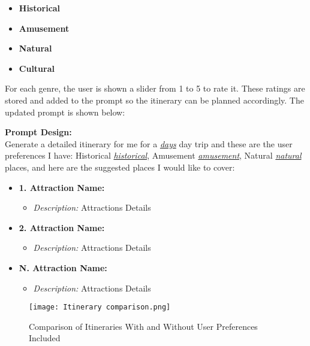 \documentclass[sigconf,authordraft]{acmart}
\begin{document}
\begin{itemize}
  \item \textbf{Historical}
  \item \textbf{Amusement}
  \item \textbf{Natural}
  \item \textbf{Cultural}
\end{itemize}

For each genre, the user is shown a slider from 1 to 5 to rate it. These ratings are stored and added to the prompt so the itinerary can be planned accordingly. The updated prompt is shown below:

\begin{tcolorbox}[linewidth=1pt, innerleftmargin=15pt, innerrightmargin=15pt, innertopmargin=15pt, innerbottommargin=15pt]
  \textbf{Prompt Design:} \\

  Generate a detailed itinerary for me for a \underline{\textit{days}} day trip and these are the user preferences I have: 
  Historical \underline{\textit{historical}}, Amusement \underline{\textit{amusement}}, Natural \underline{\textit{natural}} places, and here are the suggested places I would like to cover:

  \begin{itemize}
    \item \textbf{1. Attraction Name:}
    \begin{itemize}
        \item \textit{Description:} Attractions Details
    \end{itemize}
    \item \textbf{2. Attraction Name:}
    \begin{itemize}
        \item \textit{Description:} Attractions Details
    \end{itemize}
    \vspace{2\baselineskip} %
    \item \textbf{N. Attraction Name:}
    \begin{itemize}
        \item \textit{Description:} Attractions Details
    \end{itemize}
  \end{itemize}
\end{tcolorbox}

\begin{figure}[H]
    \centering
    \texttt{[image: Itinerary comparison.png]} %
    \caption{Comparison of Itineraries With and Without User Preferences Included}
    \label{fig:itinerary_comparison}
\end{figure}
\end{document}
